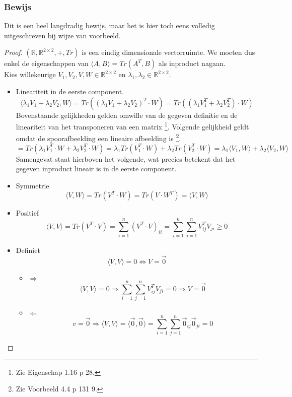 \documentclass[lineaire_algebra_oplossingen.tex]{subfiles}
\begin{document}
\subsubsection*{Bewijs}
Dit is een heel langdradig bewijs, maar het is hier toch eens volledig uitgeschreven bij wijze van voorbeeld.
\begin{proof}
$(\mathbb{R},\mathbb{R}^{2\times 2},+,Tr)$ is een eindig dimensionale vectorruimte.
We moeten dus enkel de eigenschappen van $\langle A,B \rangle = Tr(A^T,B)$ als inproduct nagaan.\\
Kies willekeurige $V_1,V_2,V, W \in \mathbb{R}^{2\times 2}$ en $\lambda_1,\lambda_2 \in \mathbb{R}^{2\times 2}$.

\begin{itemize}
\item Lineariteit in de eerste component.\\
\[
\langle \lambda_1V_1 + \lambda_2V_2,W \rangle
= Tr((\lambda_1V_1 + \lambda_2V_2)^T\cdot W)
= Tr((\lambda_1V_1^T + \lambda_2V_2^T)\cdot W)
\]
Bovenstaande gelijkheden gelden omwille van de gegeven definitie en de lineariteit van het transponeren van een matrix \footnote{Zie Eigenschap 1.16 p 28.}.
Volgende gelijkheid geldt omdat de spoorafbeelding een lineaire afbeelding is \footnote{Zie Voorbeeld 4.4 p 131 9.}.
\[
= Tr(\lambda_1V_1^T\cdot W + \lambda_2V_2^T\cdot W)
= \lambda_1Tr(V_1^T\cdot W) + \lambda_2Tr(V_2^T\cdot W)
= \lambda_1\langle V_1, W\rangle + \lambda_2\langle V_2, W\rangle
\]
Samengevat staat hierboven het volgende, wat precies betekent dat het gegeven inproduct lineair is in de eerste component.

\item Symmetrie\\
\[
\langle V,W\rangle = Tr(V^T\cdot W) = Tr(V\cdot W^T) = \langle V,W\rangle
\]

\item Positief\\
\[
\langle V,V\rangle = Tr(V^T\cdot V)
= \sum_{i=1}^n(V^T\cdot V)_{ii}
= \sum_{i=1}^n\sum_{j=1}^nV^T_{ij}V_{ji} \ge 0
\]

\item Definiet\\
\[
\langle V,V\rangle
= 0 \Leftrightarrow V=\vec{0}
\]
\begin{itemize}
\item $\Rightarrow$\\
\[
\langle V,V\rangle
= 0 \Rightarrow \sum_{i=1}^n\sum_{j=1}^nV^T_{ij}V_{ji} = 0 \Rightarrow V = \vec{0}
\]

\item $\Leftarrow$\\
\[
v = \vec{0} \Rightarrow \langle V,V\rangle = \langle \vec{0},\vec{0}\rangle
= \sum_{i=1}^n\sum_{j=1}^n\vec{0}_{ij}\vec{0}_{ji} = 0
\]

\end{itemize}

\end{itemize}
\end{proof}
\end{document}
